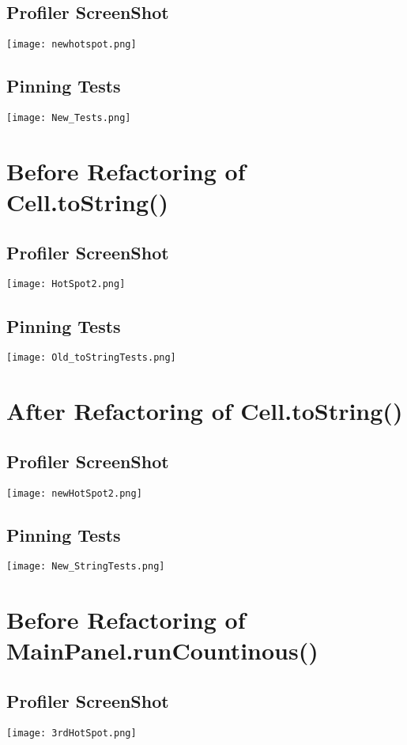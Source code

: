 \documentclass[titlepage]{article}
\begin{document}
\subsection{Profiler ScreenShot}
\texttt{[image: newhotspot.png]}
\subsection{Pinning Tests}
\texttt{[image: New\_Tests.png]}

\section{Before Refactoring of Cell.toString()}
\subsection{Profiler ScreenShot}
\texttt{[image: HotSpot2.png]}
\subsection{Pinning Tests}
\texttt{[image: Old\_toStringTests.png]}
\section{After Refactoring of Cell.toString()}
\subsection{Profiler ScreenShot}
\texttt{[image: newHotSpot2.png]}
\subsection{Pinning Tests}
\texttt{[image: New\_StringTests.png]}

\section{Before Refactoring of MainPanel.runCountinous()}
\subsection{Profiler ScreenShot}
\texttt{[image: 3rdHotSpot.png]}
\end{document}
